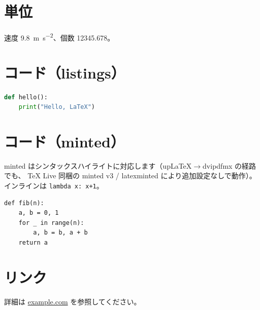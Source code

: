 \documentclass[uplatex,dvipdfmx,a4paper,11pt]{jsarticle}
\begin{document}
\section{単位}
速度 \qty{9.8}{\meter\per\second\squared}、個数 \num{12345.678}。

\section{コード（listings）}
\begin{lstlisting}[language=Python]
def hello():
    print("Hello, LaTeX")
\end{lstlisting}

\section{コード（minted）}
minted はシンタックスハイライトに対応します（upLaTeX$\to$dvipdfmx の経路でも、
TeX Live 同梱の minted v3 / latexminted により追加設定なしで動作）。
インラインは \texttt{lambda x: x+1}。
\begin{verbatim}
def fib(n):
    a, b = 0, 1
    for _ in range(n):
        a, b = b, a + b
    return a
\end{verbatim}

\section{リンク}
詳細は \href{https://example.com}{example.com} を参照してください。
\end{document}
